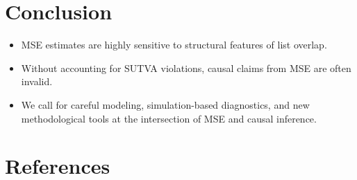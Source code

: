 \documentclass[
  12pt,
]{article}
\providecommand{\tightlist}{%
  \setlength{\itemsep}{0pt}\setlength{\parskip}{0pt}}\usepackage{longtable,booktabs,array}
\theoremstyle{plain}
\theoremstyle{definition}
\begin{document}
\section{Conclusion}\label{conclusion}

\begin{itemize}
\tightlist
\item
  MSE estimates are highly sensitive to structural features of list
  overlap.\\
\item
  Without accounting for SUTVA violations, causal claims from MSE are
  often invalid.\\
\item
  We call for careful modeling, simulation-based diagnostics, and new
  methodological tools at the intersection of MSE and causal inference.
\end{itemize}

\newpage

\section*{References}\label{references}
\end{document}
